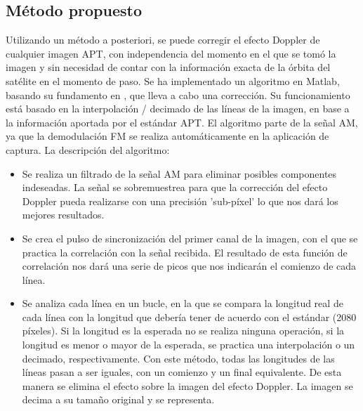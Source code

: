 \documentclass[a4paper,openright,12pt]{article}
\begin{document}
\subsection{Método propuesto} 
	
	Utilizando un método a posteriori, se puede corregir el efecto Doppler de cualquier imagen APT, con independencia del momento en el que se tomó la imagen y sin necesidad de contar con la información exacta de la órbita del satélite en el momento de paso. Se ha implementado un algoritmo en Matlab, basando su fundamento en \cite{7}, que lleva a cabo una corrección. Su funcionamiento está basado en la interpolación / decimado de las líneas de la imagen, en base a la información aportada por el estándar APT. El algoritmo parte de la señal AM, ya que la demodulación FM se realiza automáticamente en la aplicación de captura. La descripción del algoritmo:

\begin{itemize}

	\item Se realiza un filtrado de la señal AM para eliminar posibles componentes indeseadas. La señal se sobremuestrea para que la corrección del efecto Doppler pueda realizarse con una precisión 'sub-píxel' lo que nos dará los mejores resultados.
	
	\item Se crea el pulso de sincronización del primer canal de la imagen, con el que se practica la correlación con la señal recibida. El resultado de esta función de correlación nos dará una serie de picos que nos indicarán el comienzo de cada línea.
	
	\item Se analiza cada línea en un bucle, en la que se compara la longitud real de cada línea con la longitud que debería tener de acuerdo con el estándar (2080 píxeles). Si la longitud es la esperada no se realiza ninguna operación, si la longitud es menor o mayor de la esperada, se practica una interpolación o un decimado, respectivamente. Con este método, todas las longitudes de las líneas pasan a ser iguales, con un comienzo y un final equivalente. De esta manera se elimina el efecto sobre la imagen del efecto Doppler. La imagen se decima a su tamaño original y se representa.
	




\end{itemize}
	

	

\newpage
\end{document}
